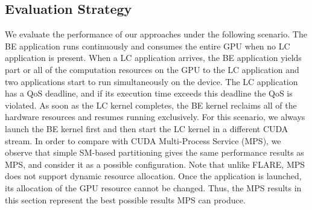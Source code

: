 \subsection{Evaluation Strategy}
    We evaluate the performance of our approaches under the following scenario. %
		The BE application runs continuously and consumes the entire GPU when no LC application is present.
		When a LC application arrives, the BE application yields part or all of the computation resources on the GPU to the LC application and two applications start to run simultaneously on the device. %
		The LC application has a QoS deadline, and if its execution time exceeds this deadline the QoS is violated.
		As soon as the LC kernel completes, the BE kernel reclaims all of the hardware resources and resumes running exclusively.
    For this scenario, we always launch the BE kernel first and then start the LC kernel in a different CUDA stream. In order to compare with CUDA Multi-Process Service (MPS), we observe that simple SM-based partitioning gives the same performance results as MPS, and consider it as a possible configuration. Note that unlike FLARE, MPS does not support dynamic resource allocation. Once the application is launched, its allocation of the GPU resource cannot be changed. Thus, the MPS results in this section represent the best possible results MPS can produce.
    
